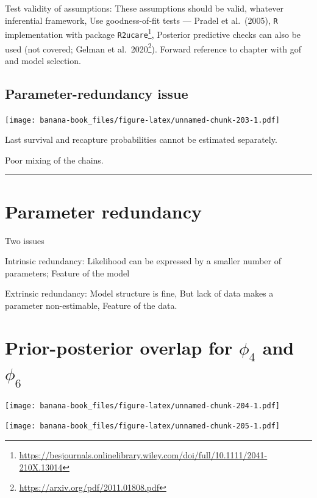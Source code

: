 \documentclass[
  12pt,
]{krantz}
\renewcommand{\href}[2]{#2\footnote{\url{#1}}}
\begin{document}
Test validity of assumptions: These assumptions should be valid, whatever inferential framework, Use goodness-of-fit tests {---} Pradel et al.~(2005), \texttt{R} implementation with \href{https://besjournals.onlinelibrary.wiley.com/doi/full/10.1111/2041-210X.13014}{package \texttt{R2ucare}}, Posterior predictive checks can also be used (not covered; \href{https://arxiv.org/pdf/2011.01808.pdf}{Gelman et al.~2020}). Forward reference to chapter with gof and model selection.

\hypertarget{parameter-redundancy-issue}{%
\subsection{Parameter-redundancy issue}\label{parameter-redundancy-issue}}

\texttt{[image: banana-book\_files/figure-latex/unnamed-chunk-203-1.pdf]}

Last survival and recapture probabilities cannot be estimated separately.

Poor mixing of the chains.

\begin{center}\rule{0.5\linewidth}{0.5pt}\end{center}

\hypertarget{parameter-redundancy}{%
\section{Parameter redundancy}\label{parameter-redundancy}}

Two issues

Intrinsic redundancy: Likelihood can be expressed by a smaller number of parameters; Feature of the model

Extrinsic redundancy: Model structure is fine, But lack of data makes a parameter non-estimable, Feature of the data.

\hypertarget{prior-posterior-overlap-for-phi_4-and-phi_6}{%
\section{\texorpdfstring{Prior-posterior overlap for \(\phi_4\) and \(\phi_6\)}{Prior-posterior overlap for \textbackslash phi\_4 and \textbackslash phi\_6}}\label{prior-posterior-overlap-for-phi_4-and-phi_6}}

\texttt{[image: banana-book\_files/figure-latex/unnamed-chunk-204-1.pdf]}

\texttt{[image: banana-book\_files/figure-latex/unnamed-chunk-205-1.pdf]}
\end{document}
